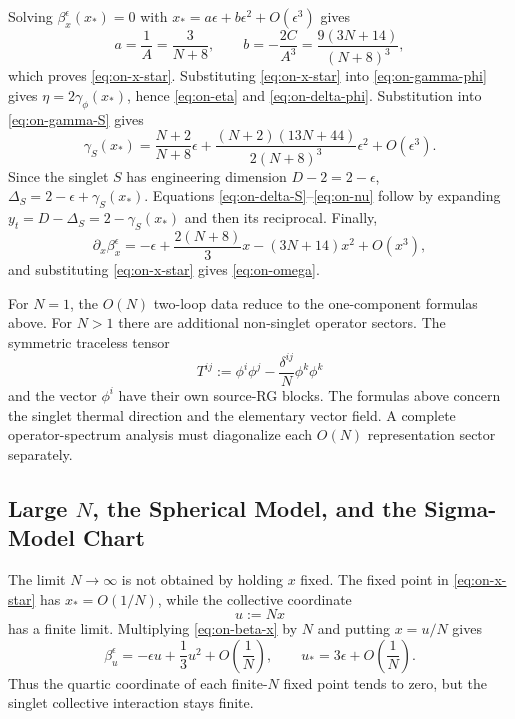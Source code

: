 Solving \(\beta_x^\epsilon(x_*)=0\) with
\(x_*=a\epsilon+b\epsilon^2+O(\epsilon^3)\) gives
\[
  a=\frac1A=\frac{3}{N+8},
  \qquad
  b=-\frac{2C}{A^3}
  =
  \frac{9(3N+14)}{(N+8)^3},
\]
which proves \eqref{eq:on-x-star}.  Substituting
\eqref{eq:on-x-star} into \eqref{eq:on-gamma-phi} gives
\(\eta=2\gamma_\phi(x_*)\), hence \eqref{eq:on-eta} and
\eqref{eq:on-delta-phi}.  Substitution into \eqref{eq:on-gamma-S} gives
\[
  \gamma_S(x_*)
  =
  \frac{N+2}{N+8}\epsilon
  +\frac{(N+2)(13N+44)}{2(N+8)^3}\epsilon^2
  +O(\epsilon^3).
\]
Since the singlet \(S\) has engineering dimension \(D-2=2-\epsilon\),
\(\Delta_S=2-\epsilon+\gamma_S(x_*)\).  Equations
\eqref{eq:on-delta-S}--\eqref{eq:on-nu} follow by expanding
\(y_t=D-\Delta_S=2-\gamma_S(x_*)\) and then its reciprocal.  Finally,
\[
  \partial_x\beta_x^\epsilon
  =
  -\epsilon
  +\frac{2(N+8)}{3}x
  -(3N+14)x^2
  +O(x^3),
\]
and substituting \eqref{eq:on-x-star} gives \eqref{eq:on-omega}.

For \(N=1\), the \(O(N)\) two-loop data reduce to the one-component formulas
above.  For \(N>1\) there are
additional non-singlet operator sectors.  The symmetric traceless tensor
\[
  T^{ij}:=\phi^i\phi^j-\frac{\delta^{ij}}{N}\phi^k\phi^k
\]
and the vector \(\phi^i\) have their own source-RG blocks.  The formulas above
concern the singlet thermal direction and the elementary vector field.  A
complete operator-spectrum analysis must diagonalize each \(O(N)\)
representation sector separately.

\subsection{\texorpdfstring{Large \(N\), the Spherical Model, and the
Sigma-Model Chart}{Large N, the Spherical Model, and the Sigma-Model
Chart}}
\label{subsec:on-large-n-spherical-sigma}

The limit \(N\to\infty\) is not obtained by holding \(x\) fixed.  The fixed
point in \eqref{eq:on-x-star} has \(x_*=O(1/N)\), while the collective
coordinate
\[
  u:=Nx
\]
has a finite limit.  Multiplying \eqref{eq:on-beta-x} by \(N\) and putting
\(x=u/N\) gives
\begin{equation}
  \beta_u^\epsilon
  =
  -\epsilon u+\frac13u^2
  +O\left(\frac1N\right),
  \qquad
  u_*=3\epsilon+O\left(\frac1N\right).
  \label{eq:on-large-n-u-beta}
\end{equation}
Thus the quartic coordinate of each finite-\(N\) fixed point tends to zero,
but the singlet collective interaction stays finite.

